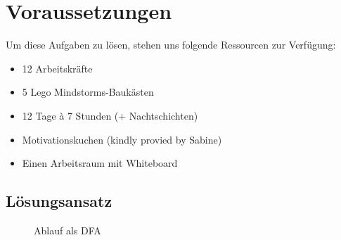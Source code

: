 \documentclass[a4paper]{scrartcl}
\begin{document}
	\section{Voraussetzungen}
	Um diese Aufgaben zu lösen, stehen uns folgende Ressourcen zur Verfügung:
	\begin{itemize}
		\item 12 Arbeitskräfte
		\item 5 Lego Mindstorms-Baukästen
		\item 12 Tage à 7 Stunden (+ Nachtschichten)
		\item Motivationskuchen (kindly provied by Sabine)
		\item Einen Arbeitsraum mit Whiteboard
	\end{itemize}
	\begin{landscape}
		\section{Lösungsansatz}
		\begin{figure}[H]
			\def\svgwidth{\linewidth}
			
			\caption{Ablauf als DFA}
		\end{figure}
	\end{landscape}
\end{document}
